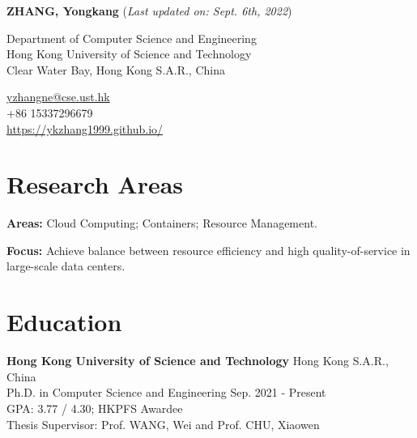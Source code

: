 \documentclass[12pt,letterpaper]{report}
\newcommand{\myname}{ZHANG, Yongkang}
\newcommand{\namefont}[1]{{\normalfont\bfseries\Huge{#1}}}
\newcommand{\listitemspace}{0.25em}
\renewenvironment{itemize}
{\begin{list}{}{\setlength{\leftmargin}{0em}
                \setlength{\parskip}{0em}
                \setlength{\itemsep}{\listitemspace}
                \setlength{\parsep}{\listitemspace}}}
{\end{list}}
\begin{document}
    \raggedright{}

    \namefont{\myname} \hfill{(\textit{Last updated on: Sept. 6th, 2022})}

    \vspace{1em}
    \begin{minipage}[t]{0.700\textwidth}
        Department of Computer Science and Engineering \\
        Hong Kong University of Science and Technology \\
        Clear Water Bay, Hong Kong S.A.R., China
    \end{minipage}	
    \begin{minipage}[t]{0.2\textwidth}
        \href{mailto:yzhangne@cse.ust.hk}{yzhangne@cse.ust.hk} \\
        +86 15337296679 \\
        \href{https://ykzhang1999.github.io/}{https://ykzhang1999.github.io/}
    \end{minipage}

\section*{Research Areas}

\begin{itemize}
	
	\item \textbf{Areas:} Cloud Computing; Containers; Resource Management.
	\item \textbf{Focus:} Achieve balance between resource efficiency and high quality-of-service in large-scale data centers.
	
\end{itemize}


\section*{Education}

\textbf{Hong Kong University of Science and Technology} \hfill {Hong Kong S.A.R., China}\\
Ph.D. in Computer Science and Engineering \hfill {Sep. 2021 - Present}\\
GPA: 3.77 / 4.30; HKPFS Awardee\\
Thesis Supervisor: Prof. WANG, Wei and Prof. CHU, Xiaowen
\end{document}
